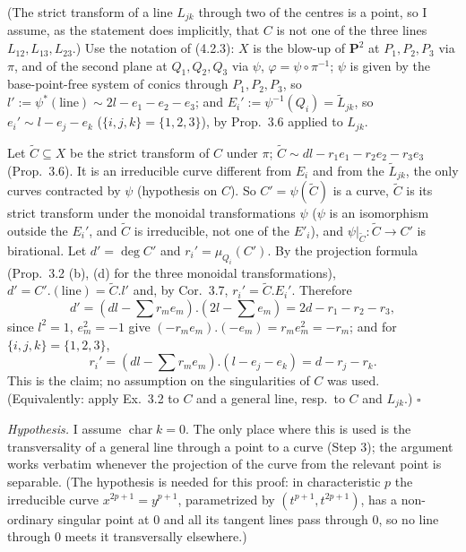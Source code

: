 \documentclass[11pt]{article}
\begin{document}
\pf
(The strict transform of a line $L_{jk}$ through two of the centres is a point, so I assume, as the statement does implicitly, that $C$ is not one of the three lines $L_{12},L_{13},L_{23}$.) Use the notation of (4.2.3): $X$ is the blow-up of $\mathbf P^2$ at $P_1,P_2,P_3$ via $\pi$, and of the second plane at $Q_1,Q_2,Q_3$ via $\psi$, $\varphi=\psi\circ\pi^{-1}$; $\psi$ is given by the base-point-free system of conics through $P_1,P_2,P_3$, so $l':=\psi^*(\text{line})\sim2l-e_1-e_2-e_3$; and $E_i':=\psi^{-1}(Q_i)=\widetilde L_{jk}$, so $e_i'\sim l-e_j-e_k$ ($\{i,j,k\}=\{1,2,3\}$), by Prop.~3.6 applied to $L_{jk}$.

Let $\widetilde C\subseteq X$ be the strict transform of $C$ under $\pi$; $\widetilde C\sim dl-r_1e_1-r_2e_2-r_3e_3$ (Prop.~3.6). It is an irreducible curve different from $E_i$ and from the $\widetilde L_{jk}$, the only curves contracted by $\psi$ (hypothesis on $C$). So $C'=\psi(\widetilde C)$ is a curve, $\widetilde C$ is its strict transform under the monoidal transformations $\psi$ ($\psi$ is an isomorphism outside the $E_i'$, and $\widetilde C$ is irreducible, not one of the $E'_i$), and $\psi|_{\widetilde C}:\widetilde C\to C'$ is birational. Let $d'=\deg C'$ and $r_i'=\mu_{Q_i}(C')$. By the projection formula (Prop.~3.2 (b), (d) for the three monoidal transformations), $d'=C'.(\text{line})=\widetilde C.l'$ and, by Cor.~3.7, $r_i'=\widetilde C.E_i'$. Therefore
\[
d'=(dl-\textstyle\sum r_me_m).(2l-\sum e_m)=2d-r_1-r_2-r_3,
\]
since $l^2=1$, $e_m^2=-1$ give $(-r_me_m).(-e_m)=r_me_m^2=-r_m$; and for $\{i,j,k\}=\{1,2,3\}$,
\[
r_i'=(dl-\textstyle\sum r_me_m).(l-e_j-e_k)=d-r_j-r_k .
\]
This is the claim; no assumption on the singularities of $C$ was used. (Equivalently: apply Ex.~3.2 to $C$ and a general line, resp.\ to $C$ and $L_{jk}$.) \hfill$\square$

\pf
\emph{Hypothesis.} I assume $\operatorname{char}k=0$. The only place where this is used is the transversality of a general line through a point to a curve (Step 3); the argument works verbatim whenever the projection of the curve from the relevant point is separable. (The hypothesis is needed for this proof: in characteristic $p$ the irreducible curve $x^{2p+1}=y^{p+1}$, parametrized by $(t^{p+1},t^{2p+1})$, has a non-ordinary singular point at $0$ and all its tangent lines pass through $0$, so no line through $0$ meets it transversally elsewhere.)
\end{document}
